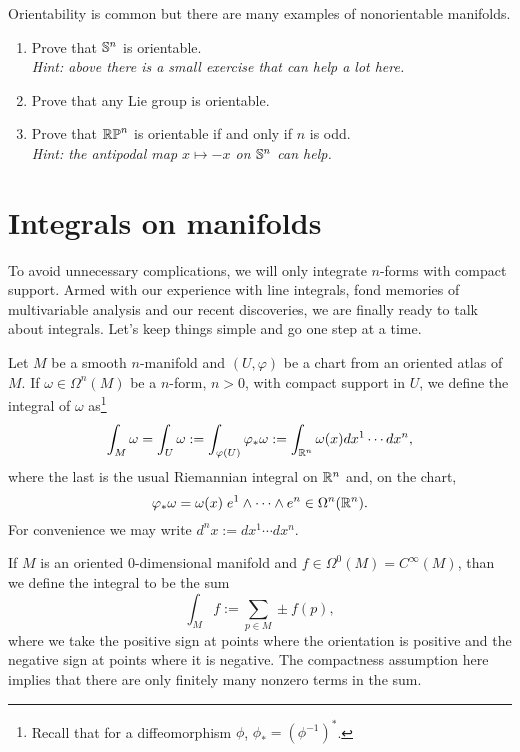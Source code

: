 \begin{exercise}
  Orientability is common but there are many examples of nonorientable manifolds.
  \begin{enumerate}
    \item Prove that $\mathbb{S}^n$ is orientable.\\
      \textit{\small Hint: above there is a small exercise that can help a lot here.}
    \item Prove that any Lie group is orientable.
    \item Prove that $\mathbb{RP}^n$ is orientable if and only if $n$ is odd. \\
      \textit{\small Hint: the antipodal map $x\mapsto -x$ on $\mathbb{S}^n$ can help.}
  \end{enumerate}
\end{exercise}

\section{Integrals on manifolds}

To avoid unnecessary complications, we will only integrate $n$-forms with compact support.
Armed with our experience with line integrals, fond memories of multivariable analysis and our recent discoveries, we are finally ready to talk about integrals.
Let's keep things simple and go one step at a time.

\begin{definition}\label{def:intnform:chart}
  Let $M$ be a smooth $n$-manifold and $(U,\varphi)$ be a chart from an oriented atlas of $M$.
  If $\omega\in\Omega^n(M)$ be a $n$-form, $n > 0$, with compact support in $U$, we define the integral of $\omega$ as\footnote{Recall that for a diffeomorphism $\phi$, $\phi_* = (\phi^{-1})^*$.}
  \begin{equation}
    \int_M \omega = \int_U \omega := \int_{\varphi(U)} \varphi_*\omega := \int_{\mathbb{R}^n} \omega(x) d x^1\cdots dx^n,
  \end{equation}
  where the last is the usual Riemannian integral on $\mathbb{R}^n$ and, on the chart,
  \begin{equation}
    \varphi_*\omega = \omega(x)\; e^{1}\wedge \cdots\wedge e^{n}\in\Omega^n(\mathbb{R}^n).
  \end{equation}
  For convenience we may write $d^n x := dx^1 \cdots dx^n$.

  If $M$ is an oriented $0$-dimensional manifold and $f\in\Omega^0(M) = C^\infty(M)$, than we define the integral to be the sum
  \begin{equation}
    \int_M f := \sum_{p\in M} \pm f(p),
  \end{equation}
  where we take the positive sign at points where the orientation is positive and the negative sign at points where it is negative.
  The compactness assumption here implies that there are only finitely many nonzero terms in the sum.
\end{definition}

